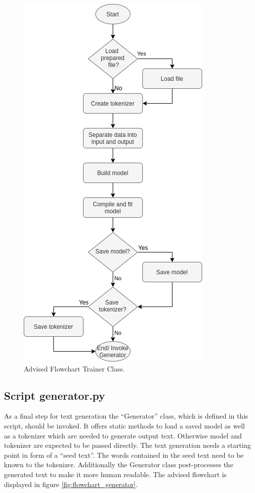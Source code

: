 \documentclass[hidelinks, conference]{IEEEtran}
\begin{document}
\begin{figure}[htbp]
\centerline{\includegraphics[scale=0.65]{pictures/flowchart_trainer.png}}
\caption{Advised Flowchart Trainer Class.}
\label{fig:flowchart_trainer}
\end{figure}

\subsection{Script generator.py}\label{subsec_generator}

As a final step for text generation the ``Generator'' class, which is defined in this script, should be invoked. It offers static methods to load a saved model as well as a tokenizer which are needed to generate output text. Otherwise model and tokenizer are expected to be passed directly. The text generation needs a starting point in form of a ``seed text''. The words contained in the seed text need to be known to the tokenizer. Additionally the Generator class post-processes the generated text to make it more human readable. The advised flowchart is displayed in figure \ref{fig:flowchart_generator}.
\end{document}
